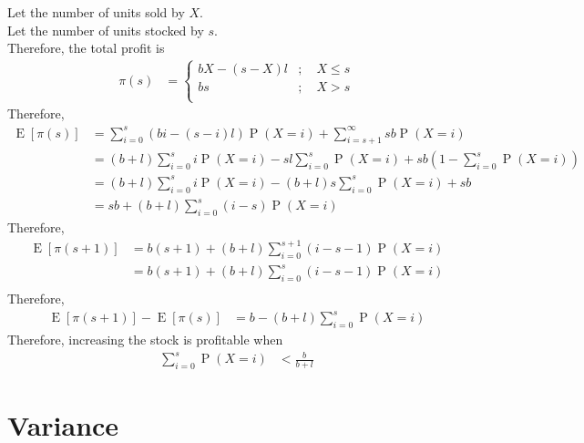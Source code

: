 \documentclass[titlepage, fleqn, a4paper, 12pt, twoside]{article}
\theoremstyle{definition}
\theoremstyle{theorem}
\DeclareMathOperator{\prob}{\mathrm{P}}
\DeclareMathOperator{\expct}{\mathrm{E}}
\begin{document}
\begin{solution}
	Let the number of units sold by $X$.\\
	Let the number of units stocked by $s$.\\
	Therefore, the total profit is
	\begin{align*}
		\pi(s) &=
			\begin{cases}
				b X - (s - X) l & ;\quad X \le s \\
				b s             & ;\quad X > s   \\
			\end{cases}
	\end{align*}
	Therefore,
	\begin{align*}
		\expct\left[ \pi(s) \right] & = \sum\limits_{i = 0}^{s} \left( b i - (s - i) l \right) \prob(X = i) + \sum\limits_{i = s + 1}^{\infty} s b \prob(X = i)                                 \\
                                            & = (b + l) \sum\limits_{i = 0}^{s} i \prob(X = i) - s l \sum\limits_{i = 0}^{s} \prob(X = i) + s b \left( 1 - \sum\limits_{i = 0}^{s} \prob(X = i) \right) \\
                                            & = (b + l) \sum\limits_{i = 0}^{s} i \prob(X = i) - (b + l) s \sum\limits_{i = 0}^{s} \prob(X = i) + s b                                                   \\
                                            & = s b + (b + l) \sum\limits_{i = 0}^{s} (i - s) \prob(X = i)
	\end{align*}
	Therefore,
	\begin{align*}
		\expct\left[ \pi(s + 1) \right] & = b (s + 1) + (b + l) \sum\limits_{i = 0}^{s + 1} (i - s - 1) \prob(X = i) \\
                                                & = b (s + 1) + (b + l) \sum\limits_{i = 0}^{s} (i - s - 1) \prob(X = i)     \\
	\end{align*}
	Therefore,
	\begin{align*}
		\expct\left[ \pi(s + 1) \right] - \expct\left[ \pi(s) \right] & = b - (b + l) \sum\limits_{i = 0}^{s} \prob(X = i)
	\end{align*}
	Therefore, increasing the stock is profitable when
	\begin{align*}
		\sum\limits_{i = 0}^{s} \prob(X = i) & < \frac{b}{b + l}
	\end{align*}
\end{solution}

\section{Variance}
\end{document}
